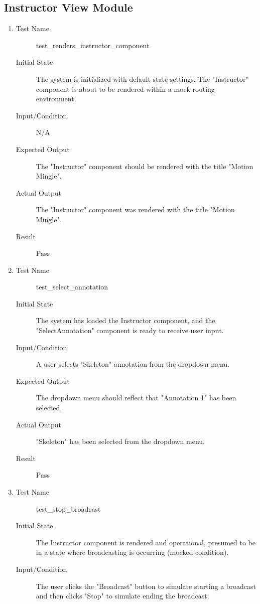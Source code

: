 \documentclass[12pt, titlepage]{article}
\begin{document}
\subsection{Instructor View Module}
\begin{enumerate}[UT-M1]
  \item \label{UT-M1}
    \begin{description}
    \item[Test Name] test\_renders\_instructor\_component
    \item[Initial State] The system is initialized with default state settings. The "Instructor" component is about to be rendered within a mock routing environment.
    \item[Input/Condition] N/A
    \item[Expected Output] The "Instructor" component should be rendered with the title "Motion Mingle".
    \item[Actual Output] The "Instructor" component was rendered with the title "Motion Mingle".
    \item[Result] Pass
    \end{description}
  \item \label{UT-M2}
    \begin{description}
    \item[Test Name] test\_select\_annotation
    \item[Initial State] The system has loaded the Instructor component, and the "SelectAnnotation" component is ready to receive user input.
    \item[Input/Condition] A user selects "Skeleton" annotation from the dropdown menu.
    \item[Expected Output] The dropdown menu should reflect that "Annotation 1" has been selected.
    \item[Actual Output] "Skeleton" has been selected from the dropdown menu.
    \item[Result] Pass
    \end{description}
  \item \label{UT-M3}
    \begin{description}
    \item[Test Name] test\_stop\_broadcast
    \item[Initial State] The Instructor component is rendered and operational, presumed to be in a state where broadcasting is occurring (mocked condition).
    \item[Input/Condition] The user clicks the "Broadcast" button to simulate starting a broadcast and then clicks "Stop" to simulate ending the broadcast.

\end{description}
\end{enumerate}
\end{document}
